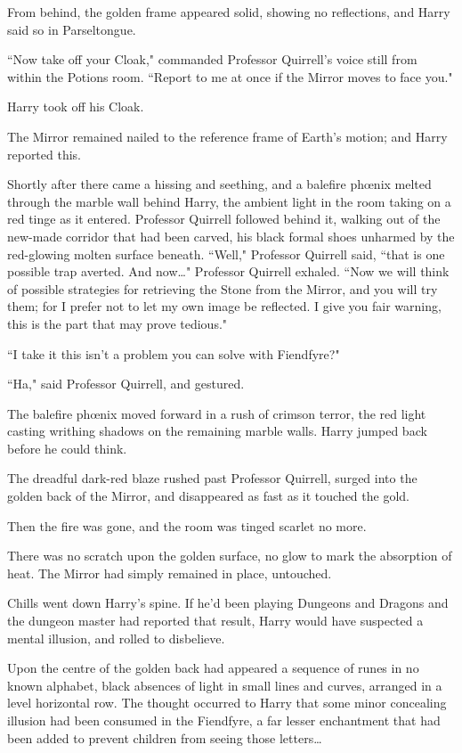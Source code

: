 From behind, the golden frame appeared solid, showing no reflections, and Harry said so in Parseltongue.

``Now take off your Cloak," commanded Professor Quirrell's voice still from within the Potions room. ``Report to me at once if the Mirror moves to face you."

Harry took off his Cloak.

The Mirror remained nailed to the reference frame of Earth's motion; and Harry reported this.

Shortly after there came a hissing and seething, and a balefire phœnix melted through the marble wall behind Harry, the ambient light in the room taking on a red tinge as it entered. Professor Quirrell followed behind it, walking out of the new-made corridor that had been carved, his black formal shoes unharmed by the red-glowing molten surface beneath. ``Well," Professor Quirrell said, ``that is one possible trap averted. And now{\ldots}" Professor Quirrell exhaled. ``Now we will think of possible strategies for retrieving the Stone from the Mirror, and you will try them; for I prefer not to let my own image be reflected. I give you fair warning, this is the part that may prove tedious."

``I take it this isn't a problem you can solve with Fiendfyre?"

``Ha," said Professor Quirrell, and gestured.

The balefire phœnix moved forward in a rush of crimson terror, the red light casting writhing shadows on the remaining marble walls. Harry jumped back before he could think.

The dreadful dark-red blaze rushed past Professor Quirrell, surged into the golden back of the Mirror, and disappeared as fast as it touched the gold.

Then the fire was gone, and the room was tinged scarlet no more.

There was no scratch upon the golden surface, no glow to mark the absorption of heat. The Mirror had simply remained in place, untouched.

Chills went down Harry's spine. If he'd been playing Dungeons and Dragons and the dungeon master had reported that result, Harry would have suspected a mental illusion, and rolled to disbelieve.

Upon the centre of the golden back had appeared a sequence of runes in no known alphabet, black absences of light in small lines and curves, arranged in a level horizontal row. The thought occurred to Harry that some minor concealing illusion had been consumed in the Fiendfyre, a far lesser enchantment that had been added to prevent children from seeing those letters{\ldots}

